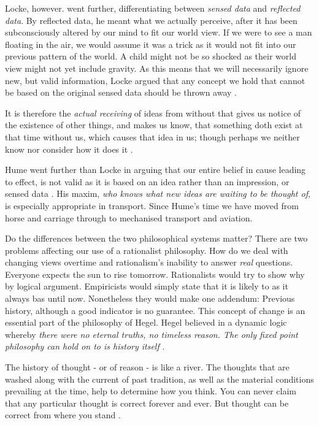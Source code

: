 Locke, however. went further, differentiating between \textit{sensed data} and \textit{reflected data}. By reflected data, he meant what we actually perceive, after it has been subconsciously altered by our mind to fit our world view. If we were to see a man floating in the air, we would assume it was a trick as it would not fit into our previous pattern of the world. A child might not be so shocked as their world view might not yet include gravity. As this means that we will necessarily ignore new, but valid information, Locke argued that any concept we hold that cannot be based on the original sensed data should be thrown away \citep{Pojman:1991}.

\begin{displayquote}
It is therefore the \textit{actual receiving} of ideas from without that gives us notice of the existence of other things, and makes us know, that something doth exist at that time without us, which causes that idea in us; though perhaps we neither know nor consider how it does it \citep{Locke:1689}.
\end{displayquote}

Hume went further than Locke in arguing that our entire belief in cause leading to effect, is not valid as it is based on an idea rather than an impression, or sensed data \citep{Hume:1748}. His maxim, \textit{who knows what new ideas are waiting to be thought of}, is especially appropriate in transport. Since Hume's time we have moved from horse and carriage through to mechanised transport and aviation.

Do the differences between the two philosophical systems matter? There are two problems affecting our use of a rationalist philosophy. How do we deal with changing views overtime and rationalism's inability to answer \textit{real} questions. Everyone expects the sun to rise tomorrow. Rationalists would try to show why by logical argument. Empiricists would simply state that it is likely to as it always bas until now. Nonetheless they would make one addendum: Previous history, although a good indicator is no guarantee. This concept of change is an essential part of the philosophy of Hegel. Hegel believed in a dynamic logic whereby \textit{there were no eternal truths, no timeless reason. The only fixed point philosophy can hold on to is history itself} \citep{Hegel:1817}.

\begin{displayquote}
The history of thought - or of reason - is like a river. The thoughts that are washed along with the current of past tradition, as well as the material conditions prevailing at the time, help to determine how you think. You can never claim that any particular thought is correct forever and ever. But thought can be correct from where you stand \citep{Gardner:1995}.
\end{displayquote}

